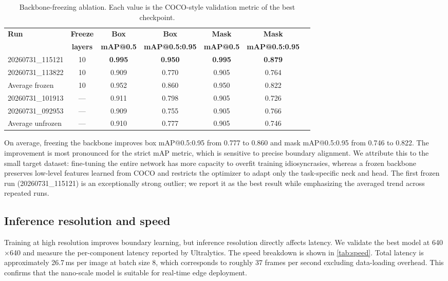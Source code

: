 \documentclass[11pt,a4paper]{article}
\begin{document}
\begin{table}[htbp]
\centering
\caption{Backbone-freezing ablation. Each value is the COCO-style validation metric of the best checkpoint.}\label{tab:ablation}
\begin{tabular}{lcccccc}
\toprule
\textbf{Run} & \textbf{Freeze} & \textbf{Box} & \textbf{Box} & \textbf{Mask} & \textbf{Mask} \\
& \textbf{layers} & \textbf{mAP@0.5} & \textbf{mAP@0.5:0.95} & \textbf{mAP@0.5} & \textbf{mAP@0.5:0.95} \\
\midrule
20260731\_115121 & 10  & \textbf{0.995} & \textbf{0.950} & \textbf{0.995} & \textbf{0.879} \\
20260731\_113822 & 10  & 0.909 & 0.770 & 0.905 & 0.764 \\
\midrule
Average frozen    & 10  & 0.952 & 0.860 & 0.950 & 0.822 \\
\midrule
20260731\_101913 & --- & 0.911 & 0.798 & 0.905 & 0.726 \\
20260731\_092953 & --- & 0.909 & 0.755 & 0.905 & 0.766 \\
\midrule
Average unfrozen  & --- & 0.910 & 0.777 & 0.905 & 0.746 \\
\bottomrule
\end{tabular}
\end{table}

On average, freezing the backbone improves box mAP@0.5:0.95 from 0.777 to 0.860 and mask mAP@0.5:0.95 from 0.746 to 0.822. The improvement is most pronounced for the strict mAP metric, which is sensitive to precise boundary alignment. We attribute this to the small target dataset: fine-tuning the entire network has more capacity to overfit training idiosyncrasies, whereas a frozen backbone preserves low-level features learned from COCO and restricts the optimizer to adapt only the task-specific neck and head. The first frozen run (20260731\_115121) is an exceptionally strong outlier; we report it as the best result while emphasizing the averaged trend across repeated runs.

\subsection{Inference resolution and speed}

Training at high resolution improves boundary learning, but inference resolution directly affects latency. We validate the best model at 640$\times$640 and measure the per-component latency reported by Ultralytics. The speed breakdown is shown in \cref{tab:speed}. Total latency is approximately 26.7\,ms per image at batch size 8, which corresponds to roughly 37 frames per second excluding data-loading overhead. This confirms that the nano-scale model is suitable for real-time edge deployment.
\end{document}
